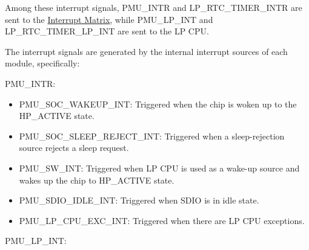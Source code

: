 \documentclass[main\_\_EN.tex]{subfiles}
\begin{document}
Among these interrupt signals, PMU\_INTR and LP\_RTC\_TIMER\_INTR are sent to the \hyperref[mod:intmtrx]{Interrupt Matrix}, while PMU\_LP\_INT and LP\_RTC\_TIMER\_LP\_INT are sent to the LP CPU.

The interrupt signals are generated by the internal interrupt sources of each module, specifically:

PMU\_INTR:

\begin{itemize}
\item \label{int:PMUSOCWAKEUPINT}PMU\_SOC\_WAKEUP\_INT: Triggered when the chip is woken up to the HP\_ACTIVE state.
\item \label{int:PMUSOCSLEEPREJECTINT}PMU\_SOC\_SLEEP\_REJECT\_INT: Triggered when a sleep-rejection source rejects a sleep request.
\item \label{int:PMUSWINT}PMU\_SW\_INT: Triggered when LP CPU is used as a wake-up source and wakes up the chip to HP\_ACTIVE state.

\item \label{int:PMUSDIOIDLEINT}PMU\_SDIO\_IDLE\_INT: Triggered when SDIO is in idle state.
\item \label{int:PMULPCPUEXCINT}PMU\_LP\_CPU\_EXC\_INT: Triggered when there are LP CPU exceptions.
\end{itemize}

PMU\_LP\_INT:
\end{document}

